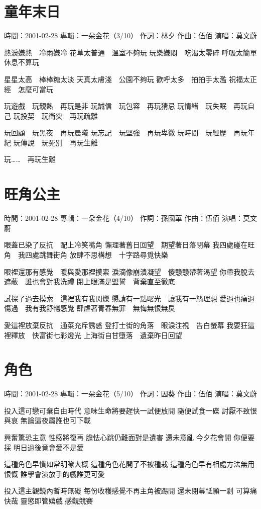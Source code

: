 \documentclass[UTF8,a4paper,oneside,twocolumn,12pt]{ctexbook}
\newcommand{\infopair}[2]{\textbullet #1：#2}
\newcommand{\zc}[1][伍佰]{\infopair{作詞}{#1}}
\newcommand{\zq}[1][伍佰]{\infopair{作曲}{#1}}
\newcommand{\zj}[1]{\infopair{專輯}{#1}}
\newcommand{\sj}[1]{\infopair{時間}{#1}}
\newenvironment{info}{\begin{flushleft}\kaishu
	}
	{\end{flushleft}\normalsize\yahei\par}
\newenvironment{lyric}{
	}
{}
\begin{document}
\section{童年末日}
\begin{info}
	\sj{2001-02-28}
	\zj{一朵金花（3/10）}
	\zc[林夕]
	\zq
	\infopair{演唱}{莫文蔚}
\end{info}
\begin{lyric}
	熱淚嫌熱　冷雨嫌冷
	花草太普通　溫室不夠玩
	玩樂嫌悶　吃渴太零碎
	呼吸太簡單　休息不算玩

	星星太高　棒棒糖太淡
	天真太膚淺　公園不夠玩
	歡呼太多　拍拍手太濫
	祝福太正經　怎麼可當玩

	玩遊戲　玩親熱　再玩是非
	玩誠信　玩包容　再玩猜忌
	玩情緒　玩失眠　再玩自己
	玩投契　玩衝突　再玩疏離

	玩回顧　玩黑夜　再玩晨曦
	玩忘記　玩堅強　再玩卑微
	玩時間　玩經歷　再玩年紀
	玩傳說　玩死別　再玩生離

	玩……　再玩生離
\end{lyric}

\section{旺角公主}
\begin{info}
	\sj{2001-02-28}
	\zj{一朵金花（4/10）}
	\zc[孫國華]
	\zq
	\infopair{演唱}{莫文蔚}
\end{info}
\begin{lyric}
	眼蓋已染了反抗　配上冷笑嘴角
	懶理著舊日回望　期望著日落閉幕
	我四處碰在旺角　我四處跳舞街角
	放肆不思構想　十字路尋覓快樂

	眼裡還那有感覺　暖與愛那裡摸索
	淚滴像崩潰凝望　傻戇戇帶著渴望
	你帶我脫去遮蔽　誰也會對我洗禮
	閉上眼滿是盟誓　背棄直至徹底

	試探了過去摸索　這裡我有我閃爍
	懇請有一點曙光　讓我有一絲理想
	愛過也痛過傷過　我有我舒暢感覺
	肆虐著青春無罪　無悔無恨無戾

	愛這裡放棄反抗　通菜充斥誘惑
	登打士街的角落　眼淚注視　告白螢幕
	我要狂這裡釋放　快富街七彩燈光
	上海街自甘墮落　遺棄昨日回望
\end{lyric}

\section{角色}
\begin{info}
	\sj{2001-02-28}
	\zj{一朵金花（5/10）}
	\zc[因葵]
	\zq
	\infopair{演唱}{莫文蔚}
\end{info}
\begin{lyric}
	投入這可戀可棄自由時代
	意味生命將要趕快一試便放開
	隨便試食一碟 討厭不致恨與哀
	無論這夜屬誰也可下載

	興奮驚恐主意 性感將復再
	膽怯心跳仍難面對是遺害
	還未意亂 今夕花會開 你便要採
	明日過後竟會愛不是愛

	這種角色早慣如常明瞭大概
	這種角色花開了不被種栽
	這種角色早有相處方法無用恨慨
	誰學會演放手的戲誰更可愛

	投入這主觀鏡內暫時無礙
	每份收穫感覺不再主角被踢開
	還未閉幕祗願一剎 可算痛快哉
	靈慾即管嬉戲 感觀競賽
\end{lyric}
\end{document}
